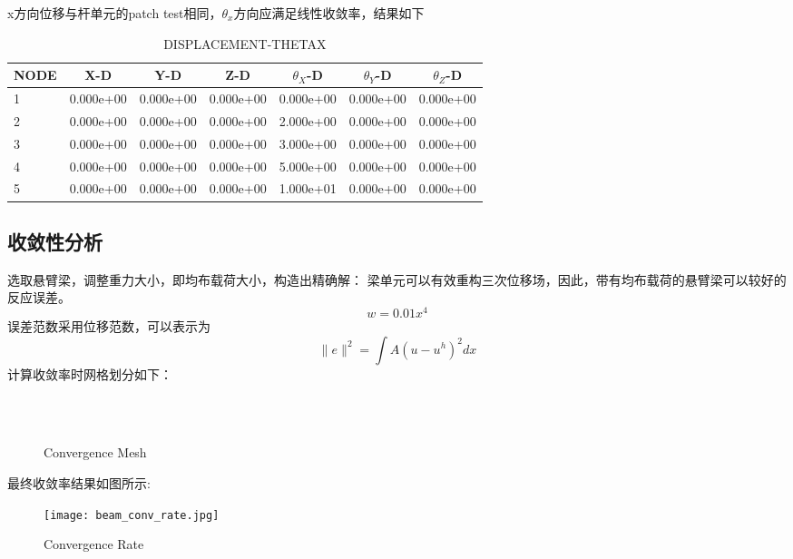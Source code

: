 \documentclass[forprint]{WHUBachelor}
\begin{document}
x方向位移与杆单元的patch test相同，$\theta_x$方向应满足线性收敛率，结果如下
\begin{table}[H]
  \centering
  \caption{DISPLACEMENT-THETAX}
    \begin{tabular}{lcccccc}
\hline
NODE & X-D&Y-D &Z-D &$\theta_X$-D &$\theta_Y$-D&$\theta_Z$-D \\
\hline
1 & 0.000e+00 & 0.000e+00 & 0.000e+00 & 0.000e+00  & 0.000e+00 & 0.000e+00\\
2 & 0.000e+00 &0.000e+00 &0.000e+00 & 2.000e+00  & 0.000e+00& 0.000e+00 \\
3 & 0.000e+00 & 0.000e+00 & 0.000e+00 & 3.000e+00 & 0.000e+00 & 0.000e+00 \\
4 & 0.000e+00 & 0.000e+00 & 0.000e+00 & 5.000e+00  &0.000e+00 & 0.000e+00\\
5 & 0.000e+00 & 0.000e+00 & 0.000e+00 & 1.000e+01  & 0.000e+00 & 0.000e+00\\
\hline
 \end{tabular}%
\end{table}
\subsection{收敛性分析}
选取悬臂梁，调整重力大小，即均布载荷大小，构造出精确解：
梁单元可以有效重构三次位移场，因此，带有均布载荷的悬臂梁可以较好的反应误差。
\begin{equation} 
w=0.01 x^{4}
 \end{equation}
误差范数采用位移范数，可以表示为
\begin{equation} 
\|e\|^2=\int A\left(u-u^{h}\right)^{2} d x
 \end{equation}
计算收敛率时网格划分如下：
\begin{figure}[H]
\centering
  \hfill
  \hfill
{}\\

  \hfill
 \hfill
{}\\
  \caption{Convergence Mesh}\label{fig:2}
\end{figure}
最终收敛率结果如图所示:
\begin{figure}[H]
\centering
    \texttt{[image: beam\_conv\_rate.jpg]}
  \caption{Convergence Rate}
\end{figure}
\end{document}
